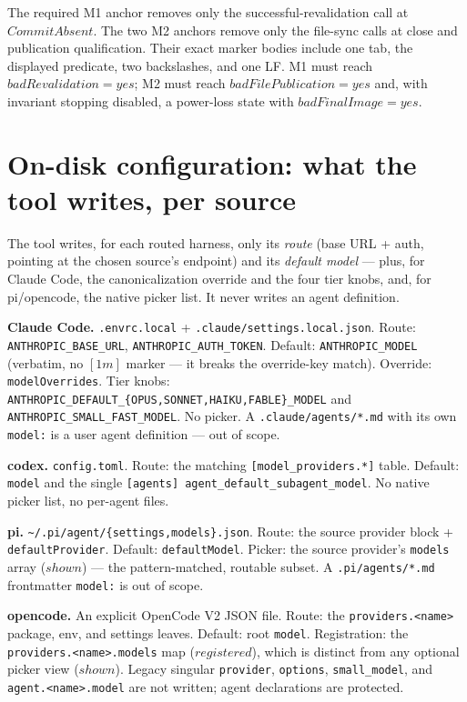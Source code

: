 \documentclass{article}
\begin{document}
The required M1 anchor removes only the successful-revalidation call at
$CommitAbsent$.  The two M2 anchors remove only the file-sync calls at close and
publication qualification.  Their exact marker bodies include one tab, the
displayed predicate, two backslashes, and one LF.  M1 must reach
$badRevalidation=yes$; M2 must reach $badFilePublication=yes$ and, with
invariant stopping disabled, a power-loss state with $badFinalImage=yes$.

\section{On-disk configuration: what the tool writes, per source}

The tool writes, for each routed harness, only its \emph{route} (base URL +
auth, pointing at the chosen source's endpoint) and its \emph{default model} ---
plus, for Claude Code, the canonicalization override and the four tier knobs,
and, for pi/opencode, the native picker list. It never writes an agent
definition.

\textbf{Claude Code.} \texttt{.envrc.local} + \texttt{.claude/settings.local.json}.
Route: \texttt{ANTHROPIC\_BASE\_URL}, \texttt{ANTHROPIC\_AUTH\_TOKEN}. Default:
\texttt{ANTHROPIC\_MODEL} (verbatim, no $[1m]$ marker --- it breaks the
override-key match). Override: \texttt{modelOverrides}. Tier knobs:
\texttt{ANTHROPIC\_DEFAULT\_\{OPUS,SONNET,HAIKU,FABLE\}\_MODEL} and
\texttt{ANTHROPIC\_SMALL\_FAST\_MODEL}. No picker. A \texttt{.claude/agents/*.md}
with its own \texttt{model:} is a user agent definition --- out of scope.

\textbf{codex.} \texttt{config.toml}. Route: the matching
\texttt{[model\_providers.*]} table. Default: \texttt{model} and the single
\texttt{[agents] agent\_default\_subagent\_model}. No native picker list, no
per-agent files.

\textbf{pi.} \texttt{\~{}/.pi/agent/\{settings,models\}.json}. Route: the source
provider block + \texttt{defaultProvider}. Default: \texttt{defaultModel}.
Picker: the source provider's \texttt{models} array ($shown$) --- the
pattern-matched, routable subset. A \texttt{.pi/agents/*.md} frontmatter
\texttt{model:} is out of scope.

\textbf{opencode.} An explicit OpenCode V2 JSON file. Route: the
\texttt{providers.<name>} package, env, and settings leaves. Default: root
\texttt{model}. Registration: the \texttt{providers.<name>.models} map
($registered$), which is distinct from any optional picker view ($shown$).
Legacy singular \texttt{provider}, \texttt{options}, \texttt{small\_model}, and
\texttt{agent.<name>.model} are not written; agent declarations are protected.
\end{document}
